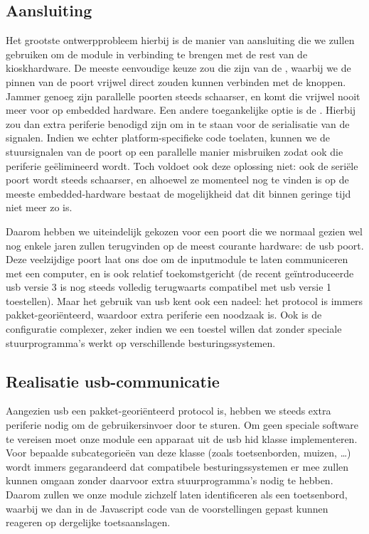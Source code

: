 \subsection{Aansluiting}

Het grootste ontwerpprobleem hierbij is de manier van aansluiting die we zullen gebruiken om de module in verbinding te brengen met de rest van de kioskhardware. De meeste eenvoudige keuze zou die zijn van de , waarbij we de pinnen van de poort vrijwel direct zouden kunnen verbinden met de knoppen. Jammer genoeg zijn parallelle poorten steeds schaarser, en komt die vrijwel nooit meer voor op embedded hardware. Een andere toegankelijke optie is de . Hierbij zou dan extra periferie benodigd zijn om in te staan voor de serialisatie van de signalen. Indien we echter platform-specifieke code toelaten, kunnen we de stuursignalen van de poort op een parallelle manier misbruiken zodat ook die periferie geëlimineerd wordt. Toch voldoet ook deze oplossing niet: ook de seriële poort wordt steeds schaarser, en alhoewel ze momenteel nog te vinden is op de meeste embedded-hardware bestaat de mogelijkheid dat dit binnen geringe tijd niet meer zo is.

Daarom hebben we uiteindelijk gekozen voor een poort die we normaal gezien wel nog enkele jaren zullen terugvinden op de meest courante hardware: de \ac{usb} poort. Deze veelzijdige poort laat ons doe om de inputmodule te laten communiceren met een computer, en is ook relatief toekomstgericht (de recent geïntroduceerde \ac{usb} versie 3 is nog steeds volledig terugwaarts compatibel met \ac{usb} versie 1 toestellen). Maar het gebruik van \ac{usb} kent ook een nadeel: het protocol is immers pakket-georiënteerd, waardoor extra periferie een noodzaak is. Ook is de configuratie complexer, zeker indien we een toestel willen dat zonder speciale stuurprogramma's werkt op verschillende besturingssystemen.

\subsection{Realisatie \acs{usb}-communicatie}

Aangezien \ac{usb} een pakket-georiënteerd protocol is, hebben we steeds extra periferie nodig om de gebruikersinvoer door te sturen. Om geen speciale software te vereisen moet onze module een apparaat uit de \ac{usb} \ac{hid} klasse implementeren. Voor bepaalde subcategorieën van deze klasse (zoals toetsenborden, muizen, \dots) wordt immers gegarandeerd dat compatibele besturingssystemen er mee zullen kunnen omgaan zonder daarvoor extra stuurprogramma's nodig te hebben. Daarom zullen we onze module zichzelf laten identificeren als een toetsenbord, waarbij we dan in de Javascript code van de voorstellingen gepast kunnen reageren op dergelijke toetsaanslagen.


